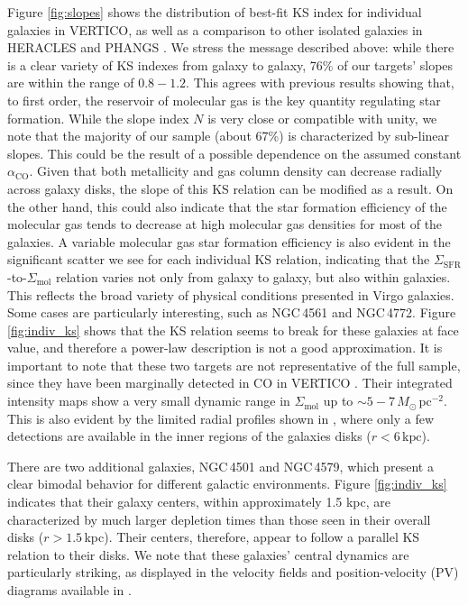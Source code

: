 \documentclass[longauth]{aa}
\begin{document}
Figure \ref{fig:slopes} shows the distribution of best-fit KS index for individual galaxies in VERTICO, as well as a comparison to other isolated galaxies in HERACLES \citep{Leroy2013} and PHANGS \citep{Pessa2021}. We stress the message described above: while there is a clear variety of KS indexes from galaxy to galaxy, 76\% of our targets' slopes are within the range of $0.8-1.2$. This agrees with previous results showing that, to first order, the reservoir of molecular gas is the key quantity regulating star formation. While the slope index $N$ is very close or compatible with unity, we note that the majority of our sample (about 67\%) is characterized by sub-linear slopes. This could be the result of a possible dependence on the assumed constant $\alpha_{\mathrm{CO}}$. Given that both metallicity and gas column density can decrease radially across galaxy disks, the slope of this KS relation can be modified as a result. On the other hand, this could also indicate that the star formation efficiency of the molecular gas tends to decrease at high molecular gas densities for most of the galaxies. A variable molecular gas star formation efficiency is also evident in the significant scatter we see for each individual KS relation, indicating that the $\Sigma_\textrm{SFR}$-to-$\Sigma_\textrm{mol}$ relation varies not only from galaxy to galaxy, but also within galaxies. This reflects the broad variety of physical conditions presented in Virgo galaxies. Some cases are particularly interesting, such as NGC\,4561 and NGC\,4772. Figure \ref{fig:indiv_ks} shows that the KS relation seems to break for these galaxies at face value, and therefore a power-law description is not a good approximation. It is important to note that these two targets are not representative of the full sample, since they have been marginally detected in CO in VERTICO \citep[see][]{Brown2021}. Their integrated intensity maps show a very small dynamic range in $\Sigma_\mathrm{mol}$ up to $\sim 5-7\,M_\odot\,\mathrm{pc}^{-2}$. This is also evident by the limited radial profiles shown in \citet{Brown2021}, where only a few detections are available in the inner regions of the galaxies disks ($r < 6\,\mathrm{kpc}$). 

There are two additional galaxies, NGC\,4501 and NGC\,4579, which present a clear bimodal behavior for different galactic environments. Figure \ref{fig:indiv_ks} indicates that their galaxy centers, within approximately 1.5 kpc, are characterized by much larger depletion times than those seen in their overall disks ($r>1.5\,$kpc). Their centers, therefore, appear to follow a parallel KS relation to their disks. We note that these galaxies' central dynamics are particularly striking, as displayed in the velocity fields and position-velocity (PV) diagrams available in \citet{Brown2021}. 
\end{document}
